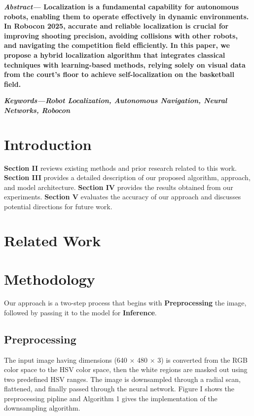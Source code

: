 \documentclass[a4paper]{article}
\begin{document}
\begin{multicols}{2}
\setlength{\columnsep}{0.5cm}

\noindent \textbf{\textit{Abstract---}
Localization is a fundamental capability for autonomous robots, enabling them 
to operate effectively in dynamic environments. In Robocon 2025, accurate and 
reliable localization is crucial for improving shooting precision, avoiding 
collisions with other robots, and navigating the competition field efficiently. 
In this paper, we propose a hybrid localization algorithm that integrates classical 
techniques with learning-based methods, relying solely on visual data from the court’s
floor to achieve self-localization on the basketball field.
}

\small	
\noindent \textbf{
  \textit{Keywords---}\textit{Robot Localization, Autonomous Navigation, Neural Networks, Robocon}}

\section{Introduction}
\par \noindent
\textbf{Section II} reviews existing methods and prior research related to this work. 
\textbf{Section III} provides a detailed description of our proposed algorithm, approach, and model architecture. 
\textbf{Section IV} provides the results obtained from our experiments. 
\textbf{Section V} evaluates the accuracy of our approach and discusses potential directions for future work.


\section{Related Work}

\section{Methodology}
\par \noindent Our approach is a two-step process that begins with \textbf{Preprocessing} the image,
followed by passing it to the model for \textbf{Inference}.
\subsection{Preprocessing}
\par \noindent The input image having dimensions (640 $\times$ 480 $\times$ 3) is converted from the RGB color space to the HSV color space, then the white regions are masked out using two predefined HSV ranges.
The image is downsampled through a radial scan, flattened, and finally passed through the neural network.
Figure I shows the preprocessing pipline and Algorithm 1 gives the implementation of the downsampling algorithm.


\end{multicols}
\end{document}
